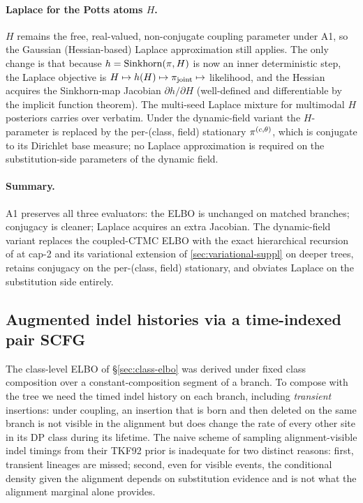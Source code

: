 \paragraph{Laplace for the Potts atoms $H$.} $H$ remains the free,
real-valued, non-conjugate coupling parameter under A1, so the
Gaussian (Hessian-based) Laplace approximation still applies. The
only change is that because $h=\mathrm{Sinkhorn}(\pi,H)$ is now an
inner deterministic step, the Laplace objective is
$H\mapsto h(H)\mapsto \pi_{\mathrm{joint}}\mapsto$ likelihood, and the Hessian
acquires the Sinkhorn-map Jacobian $\partial h/\partial H$
(well-defined and differentiable by the implicit function theorem).
The multi-seed Laplace mixture for multimodal $H$ posteriors
carries over verbatim. Under the dynamic-field variant the
$H$-parameter is replaced by the per-(class, field) stationary
$\pi^{(c,\theta)}$, which is conjugate to its Dirichlet base
measure; no Laplace approximation is required on the
substitution-side parameters of the dynamic field.

\paragraph{Summary.} A1 preserves all three evaluators: the ELBO is
unchanged on matched branches; conjugacy is cleaner; Laplace
acquires an extra Jacobian. The dynamic-field variant replaces the
coupled-CTMC ELBO with the exact hierarchical recursion of
 at cap-2 and its variational extension of
\autoref{sec:variational-suppl} on deeper trees, retains conjugacy
on the per-(class, field) stationary, and obviates Laplace on the
substitution side entirely.

\subsection{Augmented indel histories via a time-indexed pair SCFG}
\label{sec:gravestone-scfg}

The class-level ELBO of \S\ref{sec:class-elbo} was derived under
fixed class composition over a constant-composition segment of a
branch. To compose with the tree we need the timed indel history on
each branch, including \emph{transient} insertions: under coupling,
an insertion that is born and then deleted on the same branch is not
visible in the alignment but does change the rate of every other
site in its DP class during its lifetime. The naive scheme of
sampling alignment-visible indel timings from their TKF92 prior is
inadequate for two distinct reasons: first, transient lineages are
missed; second, even for visible events, the conditional density
given the alignment depends on substitution evidence and is not what
the alignment marginal alone provides.

